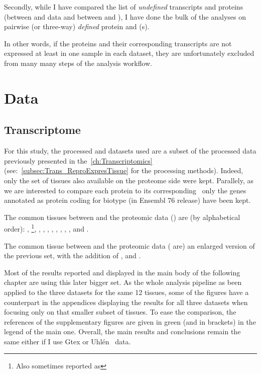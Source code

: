 Secondly, while I have compared the list of \emph{undefined} transcripts and
proteins (between  and  data and
between  and ), I have done the bulk of the
analyses on pairwise (or three-way) \emph{defined} protein and \mRNA(s).

In other words, if the proteins and their corresponding transcripts are not
expressed at least in one sample in each dataset, they are unfortunately excluded
from many many steps of the analysis workflow.

\section{Data}
\label{sec:IntegrationData}

\subsection{Transcriptome}
For this study, the processed  and  datasets
used are a subset of the processed data previously presented in
the~\cref{ch:Transcriptomics} (see:~\cref{subsec:Trans_ReproExpresTissue}
for the processing methods). Indeed, only the set of tissues also available
on the proteome side were kept. Parallely, as we are interested to compare each
protein to its corresponding \mRNA\, only the genes annotated as protein coding
for biotype (in Ensembl 76 release) have been kept.

The common tissues between  and the proteomic data
() are
(by alphabetical order):  , \footnote{Also
sometimes reported as },
, , ,
, , , , ,
 and .

The common tissue between  and the proteomic data
( are)
an enlarged version of the previous set, with the addition of ,  and .

Most of the results reported and displayed in the main body
of the following chapter are using this later bigger set. As the whole analysis
pipeline as been applied to the three datasets
for the same 12 tissues, some of the figures have a counterpart in the
appendices displaying the results for all three datasets when focusing only on
that smaller subset of tissues. To ease the comparison, the references of the
supplementary figures are given in green (and in brackets) in the legend of the
main one. Overall, the main results and conclusions remain the same either if
I use Gtex or Uhlén \etal\ data.

